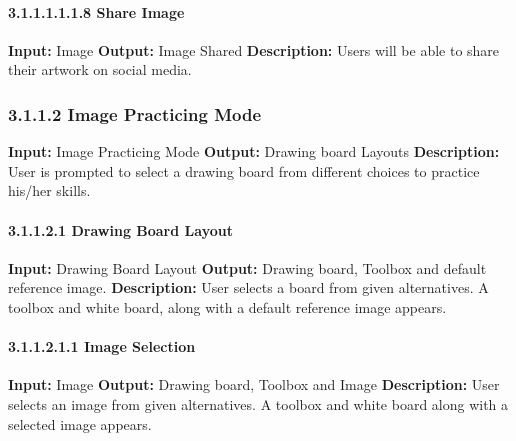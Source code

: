 \documentclass{scrreprt}
\begin{document}
\paragraph{3.1.1.1.1.1.8 Share Image}
\hfill \vspace{2.5mm} \break 
\textbf{Input:} Image \newline
\textbf{Output:} Image Shared
\vspace{1mm}\newline
\textbf{Description:} \newline 
Users will be able to share their artwork on social media.

\subsubsection{3.1.1.2 Image Practicing Mode}
\textbf{Input:} Image Practicing Mode \newline
\textbf{Output:} Drawing board Layouts
\vspace{1mm}\newline
\textbf{Description:} \newline 
User is prompted to select a drawing board from different choices to practice his/her skills.

\paragraph{3.1.1.2.1 Drawing Board Layout}
\hfill \vspace{2.5mm} \break 
\textbf{Input:} Drawing Board Layout \newline
\textbf{Output:} Drawing board, Toolbox and default reference image.
\vspace{1mm}\newline
\textbf{Description:} \newline 
User selects a board from given alternatives. A toolbox and white board, along with a default reference image appears.

\paragraph{3.1.1.2.1.1 Image Selection}
\hfill \vspace{2.5mm} \break 
\textbf{Input:} Image \newline
\textbf{Output:}  Drawing board, Toolbox and Image
\vspace{1mm}\newline
\textbf{Description:} \newline 
User selects an image from given alternatives. A toolbox and white board along with a selected image appears.
\end{document}
